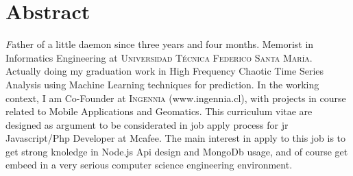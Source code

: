 
\section*{\textbf{Abstract}}
	\textsl
	Father of a little daemon since three years and four months. Memorist in Informatics Engineering at \textsc{Universidad Técnica Federico Santa María}.
	Actually doing my graduation work in High Frequency Chaotic Time Series Analysis using Machine Learning techniques for prediction.
	In the working context, I am Co-Founder at \textsc{Ingennia} (www.ingennia.cl), with projects in course related to Mobile Applications and Geomatics.
	This curriculum vitae are designed as argument to be considerated in job apply process for jr Javascript/Php Developer at Mcafee. The main interest in apply to this job is to
	get strong knoledge in Node.js Api design and MongoDb usage, and of course get embeed in a very serious computer science engineering environment. 	
    \newline
